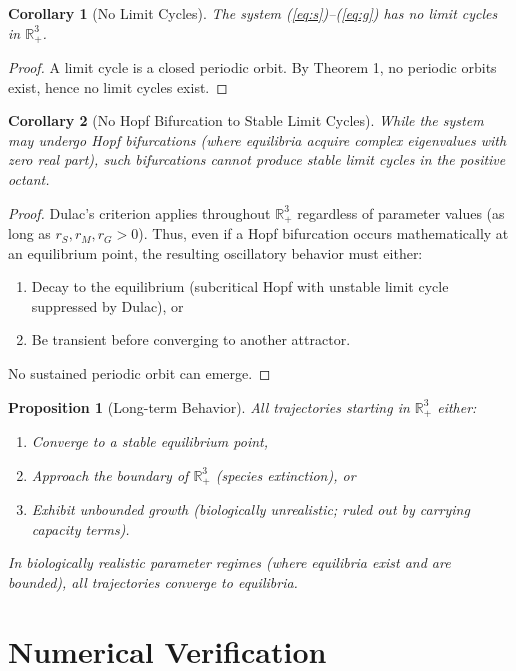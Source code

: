 \documentclass[11pt]{article}
\newtheorem{corollary}{Corollary}
\newtheorem{proposition}{Proposition}
\begin{document}
\begin{corollary}[No Limit Cycles]
The system (\ref{eq:s})--(\ref{eq:g}) has no limit cycles in $\mathbb{R}^3_+$.
\end{corollary}

\begin{proof}
A limit cycle is a closed periodic orbit. By Theorem 1, no periodic orbits exist, hence no limit cycles exist.
\end{proof}

\begin{corollary}[No Hopf Bifurcation to Stable Limit Cycles]
While the system may undergo Hopf bifurcations (where equilibria acquire complex eigenvalues with zero real part), such bifurcations cannot produce stable limit cycles in the positive octant.
\end{corollary}

\begin{proof}
Dulac's criterion applies throughout $\mathbb{R}^3_+$ regardless of parameter values (as long as $r_S, r_M, r_G > 0$). Thus, even if a Hopf bifurcation occurs mathematically at an equilibrium point, the resulting oscillatory behavior must either:
\begin{enumerate}
    \item Decay to the equilibrium (subcritical Hopf with unstable limit cycle suppressed by Dulac), or
    \item Be transient before converging to another attractor.
\end{enumerate}
No sustained periodic orbit can emerge.
\end{proof}

\begin{proposition}[Long-term Behavior]
All trajectories starting in $\mathbb{R}^3_+$ either:
\begin{enumerate}
    \item Converge to a stable equilibrium point,
    \item Approach the boundary of $\mathbb{R}^3_+$ (species extinction), or
    \item Exhibit unbounded growth (biologically unrealistic; ruled out by carrying capacity terms).
\end{enumerate}
In biologically realistic parameter regimes (where equilibria exist and are bounded), all trajectories converge to equilibria.
\end{proposition}

\section{Numerical Verification}
\end{document}
